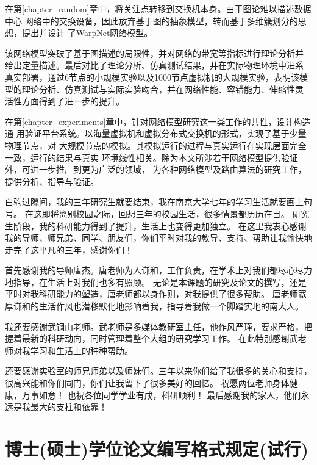 \documentclass[master]{njuthesis}
\begin{document}
在第\ref{chapter_random}章中，将关注点转移到交换机本身。由于图论难以描述数据中心
网络中的交换设备，因此放弃基于图的抽象模型，转而基于多维簇划分的思想，提出并设计
了WarpNet网络模型。

该网络模型突破了基于图描述的局限性，并对网络的带宽等指标进行理论分析并
给出定量描述。最后对比了理论分析、仿真测试结果，并在实际物理环境中进系
真实部署，通过6节点的小规模实验以及1000节点虚拟机的大规模实验，表明该模
型的理论分析、仿真测试与实际实验吻合，并在网络性能、容错能力、伸缩性灵
活性方面得到了进一步的提升。

在第\ref{chapter_experiments}章中，针对网络模型研究这一类工作的共性，设计构造通
用验证平台系统。以海量虚拟机和虚拟分布式交换机的形式，实现了基于少量物理节点，对
大规模节点的模拟。其模拟运行的过程与真实运行在实现层面完全一致，运行的结果与真实
环境线性相关。除为本文所涉若干网络模型提供验证外，可进一步推广到更为广泛的领域，
为各种网络模型及路由算法的研究工作，提供分析、指导与验证。

\begin{acknowledgement}
白驹过隙间，我的三年研究生就要结束，我在南京大学七年的学习生活就要画上句号。
在这即将离别校园之际，回想三年的校园生活，很多情景都历历在目。
研究生阶段，我的科研能力得到了提升，生活上也变得更加独立。
在这里我衷心感谢我的导师、师兄弟、同学、朋友们，你们平时对我的教导、支持、帮助让我愉快地走完了这平凡的三年，感谢你们！

首先感谢我的导师唐杰。唐老师为人谦和，工作负责，在学术上对我们都尽心尽力地指导，在生活上对我们也多有照顾。
无论是本课题的研究及论文的撰写，还是平时对我科研能力的塑造，唐老师都以身作则，对我提供了很多帮助。
唐老师宽厚谦和的生活作风也潜移默化地影响着我，指导着我做一个脚踏实地的南大人。

我还要感谢武钢山老师。武老师是多媒体教研室主任，他作风严瑾，要求严格，把握着最新的科研动向，同时管理着整个大组的研究学习工作。
在此特别感谢武老师对我学习和生活上的种种帮助。

还要感谢实验室的师兄师弟以及师妹们。三年以来你们给了我很多的关心和支持，很高兴能和你们同门，你们让我留下了很多美好的回忆。
祝愿两位老师身体健康，万事如意！ 也祝各位同学学业有成，科研顺利！
最后感谢我的家人，他们永远是我最大的支柱和依靠！

\end{acknowledgement}

\appendix

\chapter{博士(硕士)学位论文编写格式规定(试行)}
\end{document}
